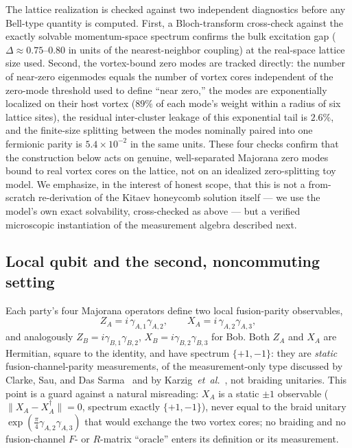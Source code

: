 \documentclass[aps,pra,twocolumn,superscriptaddress,floatfix,nofootinbib]{revtex4-2}
\begin{document}
The lattice realization is checked against two independent
diagnostics before any Bell-type quantity is computed. First, a
Bloch-transform cross-check against the exactly solvable momentum-space
spectrum confirms the bulk excitation gap ($\Delta\approx0.75$--$0.80$
in units of the nearest-neighbor coupling) at the real-space lattice
size used. Second, the vortex-bound zero modes are tracked directly:
the number of near-zero eigenmodes equals the number of vortex cores
independent of the zero-mode threshold used to define ``near
zero,'' the modes are exponentially localized on their host vortex
($89\%$ of each mode's weight within a radius of six lattice
sites), the residual inter-cluster leakage of this exponential tail is
$2.6\%$, and the finite-size splitting between the modes nominally
paired into one fermionic parity is $5.4\times10^{-2}$ in the same
units. These four checks confirm that the construction below acts on
genuine, well-separated Majorana zero modes bound to real vortex
cores on the lattice, not on an idealized zero-splitting toy model. We
emphasize, in the interest of honest scope, that this is not a
from-scratch re-derivation of the Kitaev honeycomb solution itself
--- we use the model's own exact solvability, cross-checked as above
--- but a verified microscopic instantiation of the measurement
algebra described next.

\subsection{Local qubit and the second, noncommuting setting}
\label{sec:algebra}

Each party's four Majorana operators define two local fusion-parity
observables,
\begin{equation}
\label{eq:ZAXA}
Z_A = i\,\gamma_{A,1}\gamma_{A,2}, \qquad
X_A = i\,\gamma_{A,2}\gamma_{A,3},
\end{equation}
and analogously $Z_B=i\gamma_{B,1}\gamma_{B,2}$,
$X_B=i\gamma_{B,2}\gamma_{B,3}$ for Bob. Both $Z_A$ and $X_A$ are
Hermitian, square to the identity, and have spectrum $\{+1,-1\}$: they
are \emph{static} fusion-channel-parity measurements, of the
measurement-only type discussed by Clarke, Sau, and Das
Sarma~\cite{ClarkeSauDasSarma2016} and by
Karzig~\emph{et~al.}~\cite{Karzig2017}, not braiding unitaries. This
point is a guard against a natural misreading: $X_A$ is a static
$\pm1$ observable ($\lVert X_A-X_A^\dagger\rVert=0$, spectrum exactly
$\{+1,-1\}$), never equal to the braid unitary
$\exp(\tfrac{\pi}{4}\gamma_{A,2}\gamma_{A,3})$ that would exchange the
two vortex cores; no braiding and no fusion-channel $F$- or
$R$-matrix ``oracle'' enters its definition or its measurement.
\end{document}
